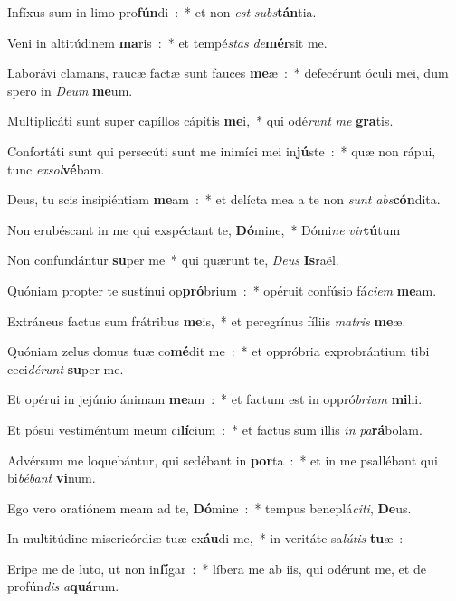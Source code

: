 ﻿\item Infíxus sum in limo pro\textbf{fún}di~:~* et non \emph{est} \emph{subs}\textbf{tán}tia.
\item Veni in altitúdinem \textbf{ma}ris~:~* et tempé\emph{stas} \emph{de}\textbf{mér}sit me.
\item Laborávi clamans, raucæ factæ sunt fauces \textbf{me}æ~:~* defecérunt óculi mei, dum spero in \emph{De}\emph{um} \textbf{me}um.
\item Multiplicáti sunt super capíllos cápitis \textbf{me}i,~* qui odé\emph{runt} \emph{me} \textbf{gra}tis.
\item Confortáti sunt qui persecúti sunt me inimíci mei in\textbf{jú}ste~:~* quæ non rápui, tunc \emph{ex}\emph{sol}\textbf{vé}bam.
\item Deus, tu scis insipiéntiam \textbf{me}am~:~* et delícta mea a te non \emph{sunt} \emph{abs}\textbf{cón}dita.
\item Non erubéscant in me qui exspéctant te, \textbf{Dó}mine,~* Dómi\emph{ne} \emph{vir}\textbf{tú}tum
\item Non confundántur \textbf{su}per me~* qui quærunt te, \emph{De}\emph{us} \textbf{Is}raël.
\item Quóniam propter te sustínui op\textbf{pró}brium~:~* opéruit confúsio fá\emph{ci}\emph{em} \textbf{me}am.
\item Extráneus factus sum frátribus \textbf{me}is,~* et peregrínus fíliis \emph{ma}\emph{tris} \textbf{me}æ.
\item Quóniam zelus domus tuæ co\textbf{mé}dit me~:~* et oppróbria exprobrántium tibi ceci\emph{dé}\emph{runt} \textbf{su}per me.
\item Et opérui in jejúnio ánimam \textbf{me}am~:~* et factum est in oppró\emph{bri}\emph{um} \textbf{mi}hi.
\item Et pósui vestiméntum meum ci\textbf{lí}cium~:~* et factus sum illis \emph{in} \emph{pa}\textbf{rá}bolam.
\item Advérsum me loquebántur, qui sedébant in \textbf{por}ta~:~* et in me psallébant qui bi\emph{bé}\emph{bant} \textbf{vi}num.
\item Ego vero oratiónem meam ad te, \textbf{Dó}mine~:~* tempus beneplá\emph{ci}\emph{ti}, \textbf{De}us.
\item In multitúdine misericórdiæ tuæ ex\textbf{áu}di me,~* in veritáte sa\emph{lú}\emph{tis} \textbf{tu}æ~:
\item Eripe me de luto, ut non in\textbf{fí}gar~:~* líbera me ab iis, qui odérunt me, et de profún\emph{dis} \emph{a}\textbf{quá}rum.
